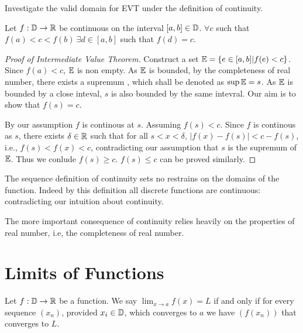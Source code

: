 \documentclass[../note.tex]{subfiles}
\begin{document}
\begin{hypothesis}
	Investigate the valid domain for EVT under the definition of continuity. 
\end{hypothesis}

\begin{theorem}
	Let $f: \mathbb{D} \rightarrow \mathbb{R}$ be continuous on the interval $[a,b]\in \mathbb{D}$. $\forall c $ such that $f(a)<c<f(b)\ \exists d \in [a,b] $ such that $ f(d) = c$.  
\end{theorem}

\begin{proof}[Proof of Intermediate Value Theorem]
	Construct a set $\mathbb{E} = \{e\in [a,b]| f(e)<c\}$. Since $f(a)<c$, $\mathbb{E}$ is non empty.  
	As $\mathbb{E}$ is bounded, by the completeness of real number, there exists a supremum , which shall be denoted as $\sup{\mathbb{E}}=s$. 
	As $\mathbb{E}$ is bounded by a close inteval, $s$ is also bounded by the same intevral. Our aim is to show that $f(s)=c$.

	By our assumption $f$ is continous at $s$. Assuming $f(s) < c$. 
	Since $f$ is continous as $s$, there exists $\delta \in \mathbb{R}$ such that for all $s<x<\delta$, $|f(x)-f(s)|<c-f(s)$, i.e., $f(s)<f(x)<c$, contradicting our assumption that $s$ is the supremum of $\mathbb{E}$. 
	Thus we conlude $f(s)\geq c$. $f(s)\leq c$ can be proved similarly.
\end{proof}

\begin{remark}
	The sequence definition of continuity sets no restrains on the domains of the function. Indeed by this definition all discrete functions are continuous: contradicting our intuition about continuity.
	
	The more important consequence of continuity relies heavily on the properties of real number, i.e, the completeness of real number.
\end{remark}

\section{Limits of Functions}

\begin{definition}\label{SequenceDefinitionOfLimit}
	Let $f: \mathbb{D} \rightarrow \mathbb{R}$ be a function. 
	We say $\lim_{x \rightarrow a} f(x)=L$ if and only if for every sequence $(x_n)$, provided $x_i \in \mathbb{D}$, which converges to $a$ we have $(f(x_n))$ that converges to $L$.	
\end{definition}
\end{document}
